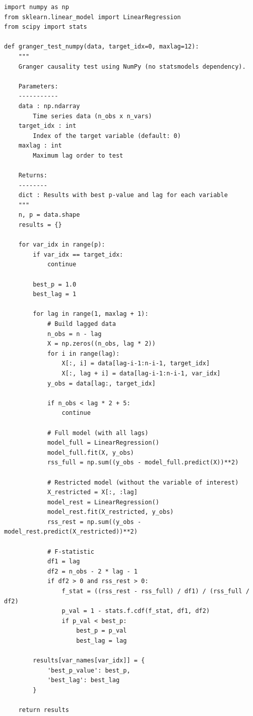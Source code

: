 \documentclass[12pt,a4paper,twocolumn]{article}
\begin{document}
\begin{lstlisting}[caption={Granger Causality Test with NumPy}, label=lst:granger]
import numpy as np
from sklearn.linear_model import LinearRegression
from scipy import stats

def granger_test_numpy(data, target_idx=0, maxlag=12):
    """
    Granger causality test using NumPy (no statsmodels dependency).
    
    Parameters:
    -----------
    data : np.ndarray
        Time series data (n_obs x n_vars)
    target_idx : int
        Index of the target variable (default: 0)
    maxlag : int
        Maximum lag order to test
    
    Returns:
    --------
    dict : Results with best p-value and lag for each variable
    """
    n, p = data.shape
    results = {}
    
    for var_idx in range(p):
        if var_idx == target_idx:
            continue
        
        best_p = 1.0
        best_lag = 1
        
        for lag in range(1, maxlag + 1):
            # Build lagged data
            n_obs = n - lag
            X = np.zeros((n_obs, lag * 2))
            for i in range(lag):
                X[:, i] = data[lag-i-1:n-i-1, target_idx]
                X[:, lag + i] = data[lag-i-1:n-i-1, var_idx]
            y_obs = data[lag:, target_idx]
            
            if n_obs < lag * 2 + 5:
                continue
            
            # Full model (with all lags)
            model_full = LinearRegression()
            model_full.fit(X, y_obs)
            rss_full = np.sum((y_obs - model_full.predict(X))**2)
            
            # Restricted model (without the variable of interest)
            X_restricted = X[:, :lag]
            model_rest = LinearRegression()
            model_rest.fit(X_restricted, y_obs)
            rss_rest = np.sum((y_obs - model_rest.predict(X_restricted))**2)
            
            # F-statistic
            df1 = lag
            df2 = n_obs - 2 * lag - 1
            if df2 > 0 and rss_rest > 0:
                f_stat = ((rss_rest - rss_full) / df1) / (rss_full / df2)
                p_val = 1 - stats.f.cdf(f_stat, df1, df2)
                if p_val < best_p:
                    best_p = p_val
                    best_lag = lag
        
        results[var_names[var_idx]] = {
            'best_p_value': best_p,
            'best_lag': best_lag
        }
    
    return results
\end{lstlisting}
\end{document}
